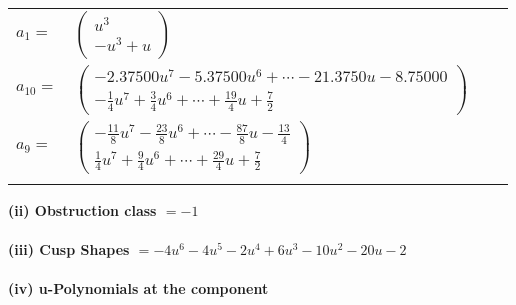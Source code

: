 \documentclass[1p]{elsarticle_modified}
\theoremstyle{definition}
\begin{document}
\begin{tabular}{m{7pt} m{180pt} m{7pt} m{180pt} }
\flushright $a_{1}=$&$\begin{pmatrix}u^3\\- u^3+u\end{pmatrix}$ \\
\flushright $a_{10}=$&$\begin{pmatrix}-2.37500 u^{7}-5.37500 u^{6}+\cdots-21.3750 u-8.75000\\-\frac{1}{4} u^7+\frac{3}{4} u^6+\cdots+\frac{19}{4} u+\frac{7}{2}\end{pmatrix}$ \\
\flushright $a_{9}=$&$\begin{pmatrix}-\frac{11}{8} u^7-\frac{23}{8} u^6+\cdots-\frac{87}{8} u-\frac{13}{4}\\\frac{1}{4} u^7+\frac{9}{4} u^6+\cdots+\frac{29}{4} u+\frac{7}{2}\end{pmatrix}$\\&\end{tabular}
\flushleft \textbf{(ii) Obstruction class $= -1$}\\~\\
\flushleft \textbf{(iii) Cusp Shapes $= -4 u^6-4 u^5-2 u^4+6 u^3-10 u^2-20 u-2$}\\~\\
\newpage\renewcommand{\arraystretch}{1}
\flushleft \textbf{(iv) u-Polynomials at the component}\newline \\
\end{document}
